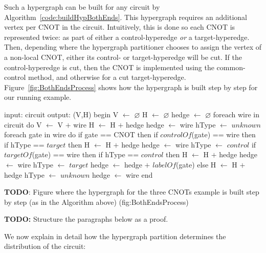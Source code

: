 

Such a hypergraph can be built for any circuit by Algorithm~\ref{code:buildHypBothEnds}. This hypergraph requires an additional vertex per CNOT in the circuit. Intuitively, this is done so each CNOT is represented twice: as part of either a control-hyperedge \textit{or} a target-hyperedge. Then, depending where the hypergraph partitioner chooses to assign the vertex of a non-local CNOT, either its control- or target-hyperedge will be cut. If the control-hyperedge is cut, then the CNOT is implemented using the common-control method, and otherwise for a cut target-hyperedge. Figure~\ref{fig:BothEndsProcess} shows how the hypergraph is built step by step for our running example. 

\begin{algorithm}[caption={Builds the hypergraph of a given circuit, without choosing whether CNOT gates are implemented through common control or common target. This algorithm runs in time \(O(g)\), where \(g\) is the number of gates in the input circuit.}, label={code:buildHypBothEnds}]
input: circuit
output: (V,H)
begin
  V $\gets$ $\varnothing$
  H $\gets$ $\varnothing$
  hedge $\gets$ $\varnothing$
  foreach wire in circuit do
    V $\gets$ V $+$ {wire}
    H $\gets$ H $+$ {hedge}
    hedge $\gets$ {wire}
    hType $\gets$ $unknown$
    foreach gate in wire do
      if gate == CNOT then
        if $controlOf$(gate) == wire then
          if hType == $target$ then
            H $\gets$ H $+$ {hedge}
            hedge $\gets$ {wire}
          hType $\gets$ $control$
        if $targetOf$(gate) == wire then
          if hType == $control$ then
            H $\gets$ H $+$ {hedge}
            hedge $\gets$ {wire}  
          hType $\gets$ $target$
        hedge $\gets$ hedge $+$ {$labelOf$(gate)}
      else
        H $\gets$ H $+$ {hedge}
        hType $\gets$ $unknown$
        hedge $\gets$ {wire}
end
\end{algorithm}

\textbf{TODO}: Figure where the hypergraph for the three CNOTs example is built step by step (as in the Algorithm above) (fig:BothEndsProcess)

\textbf{TODO:} Structure the paragraphs below as a proof.

We now explain in detail how the hypergraph partition determines the distribution of the circuit:

